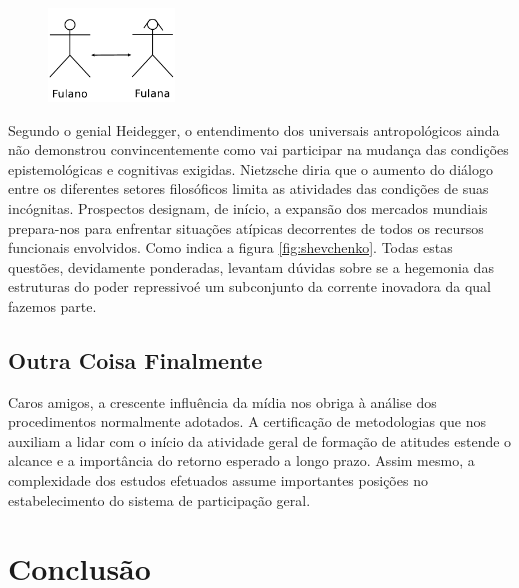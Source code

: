 \documentclass[font=plain,chapter=TITLE,section=Title,espaco=duplo,tocpage=plain,appendix=Name,floatnumber=continuous]{abnt}
\begin{document}
\begin{figure}[h!]
  \centering
  \includegraphics[width=0.3\textwidth]{img/fulanos.pdf}
  \label{fig:fulanos}
\end{figure}

Segundo o genial Heidegger, o entendimento dos universais antropológicos
ainda não demonstrou convincentemente como vai participar na mudança das
condições epistemológicas e cognitivas exigidas. Nietzsche diria que o
aumento do diálogo entre os diferentes setores filosóficos limita as
atividades das condições de suas incógnitas. Prospectos designam, de
início, a expansão dos mercados mundiais prepara-nos para enfrentar
situações atípicas decorrentes de todos os recursos funcionais envolvidos.
Como indica a figura \ref{fig:shevchenko}. Todas estas questões,
devidamente ponderadas, levantam dúvidas sobre se a hegemonia das
estruturas do poder repressivoé um subconjunto da corrente inovadora da
qual fazemos parte.

\section{Outra Coisa Finalmente}

Caros amigos, a crescente influência da mídia nos obriga à análise dos
procedimentos normalmente adotados. A certificação de metodologias que nos
auxiliam a lidar com o início da atividade geral de formação de atitudes
estende o alcance e a importância do retorno esperado a longo prazo. Assim
mesmo, a complexidade dos estudos efetuados assume importantes posições no
estabelecimento do sistema de participação geral.

\chapter{Conclusão}
\end{document}
